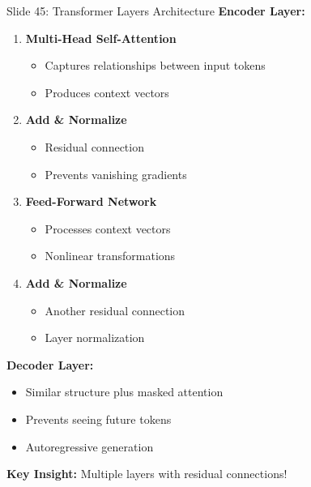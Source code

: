 \documentclass[8pt]{beamer}
\begin{document}
	\begin{frame}{Slide 45: Transformer Layers Architecture}
		\fontsize{6.5}{7.5}\selectfont
		\textbf{Encoder Layer:}
		\begin{enumerate}
			\item \textbf{Multi-Head Self-Attention}
			\begin{itemize}
				\item Captures relationships between input tokens
				\item Produces context vectors
			\end{itemize}
			\item \textbf{Add \& Normalize}
			\begin{itemize}
				\item Residual connection
				\item Prevents vanishing gradients
			\end{itemize}
			\item \textbf{Feed-Forward Network}
			\begin{itemize}
				\item Processes context vectors
				\item Nonlinear transformations
			\end{itemize}
			\item \textbf{Add \& Normalize}
			\begin{itemize}
				\item Another residual connection
				\item Layer normalization
			\end{itemize}
		\end{enumerate}
		
		\vspace{0.1cm}
		\textbf{Decoder Layer:}
		\begin{itemize}
			\item Similar structure plus masked attention
			\item Prevents seeing future tokens
			\item Autoregressive generation
		\end{itemize}
		
		\textcolor{myblue}{\textbf{Key Insight:}} Multiple layers with residual connections!
	\end{frame}
	
\end{document}
